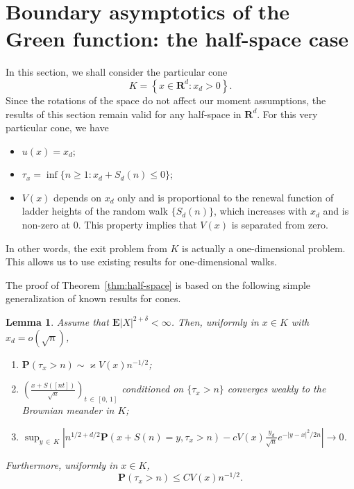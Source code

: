 \documentclass[10pt]{amsart}
\newtheorem{lemm}[theo]{Lemma}\newtheorem{prop}[theo]{Proposition}\newtheorem{coro}[theo]{Corollary}\newtheorem{conj}[theo]{Conjecture}
\theoremstyle{definition}\newtheorem{defi}[theo]{Definition}\newtheorem{rema}[theo]{Remark}\newtheorem{exam}[theo]{Example}\newtheorem{exem}[theo]{Example}\newtheorem{nota}[theo]{Notation}
\newcommand{\pr}{\mathbf{P}}
\newcommand{\e}{\mathbf{E}}
\newcommand{\bfR}{\mathbf{R}}
\renewcommand{\le}{\leqslant}
\renewcommand{\ge}{\geqslant}
\newcommand*{\alphenumi}{\renewcommand*{\theenumi}{\alph{enumi}}}
\begin{document}
\section{Boundary asymptotics of the Green function: the half-space case}\label{sec:half-space}

In this section, we shall consider the particular cone
\[
K=\left\{x\in\bfR^d:x_d>0\right\}.
\]
Since the rotations of the space do not affect our moment assumptions, the results of this section remain valid for any half-space in $\bfR^d$. For this very particular cone, we have
\begin{itemize}
\item $u(x)=x_d$;
\item $\tau_x=\inf\{n\ge1:x_d+S_d(n)\le0\}$;
\item $V(x)$ depends on $x_d$ only and is proportional to the renewal function of ladder heights of the random walk $\{S_d(n)\}$, which increases with $x_d$ and is non-zero at $0$. This property implies that $V(x)$ is separated from zero.
\end{itemize}
In other words, the exit problem from $K$ is actually a one-dimensional problem. This allows us to use existing results for one-dimensional walks.



The proof of Theorem~\ref{thm:half-space} is based on the following simple generalization of known results for cones.
\begin{lemm}\label{lem:half-space}
Assume that $\e| X|^{2+\delta}<\infty$. Then, uniformly in $x\in K$ with $x_d=o(\sqrt{n})$,
\begin{enumerate}\alphenumi
\item\label{lem:it-a}
$\pr(\tau_x>n)\sim \varkappa V(x)n^{-1/2}$;
\item\label{lem:it-b}
$\left(\frac{x+S([nt])}{\sqrt{n}}\right)_{t\,\in\,[0,\,1]}$ conditioned on $\{\tau_x>n\}$ converges weakly to the Brownian meander in $K$;
\item\label{lem:it-c}
$\sup_{y\,\in\,K}\left| n^{1/2+d/2}\pr\left(x+S(n)=y,\tau_x>n\right)-cV(x)\frac{y_d}{\sqrt{n}}e^{-| y-x|^2/2n}\right|\to0$.
\end{enumerate}
Furthermore, uniformly in $x\in K$,
\[
\pr(\tau_x>n)\le C V(x)n^{-1/2}.
\]
\end{lemm}
\end{document}
